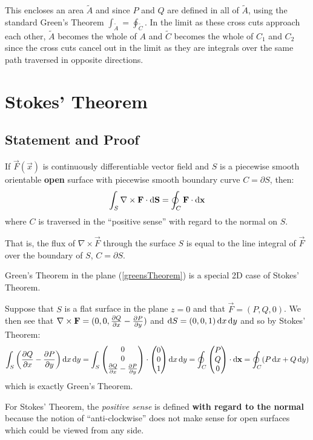 \documentclass[../main.tex]{subfiles}
\begin{document}
This encloses an area $\widetilde{A}$ and since $P$ and $Q$ are defined in all of $\widetilde{A}$, using the standard Green's Theorem $\int_{\widetilde{A}} = \oint_{\widetilde{C}}$.
In the limit as these cross cuts approach each other, $\widetilde{A}$ becomes the whole of $A$ and $\widetilde{C}$ becomes the whole of $C_1$ and $C_2$ since the cross cuts cancel out in the limit as they are integrals over the same path traversed in opposite directions.
\section{Stokes' Theorem}
\subsection{Statement and Proof}
\begin{theorem}
  If $\vec{F}(\vec{x})$ is continuously differentiable vector field and $S$ is a piecewise smooth orientable \textbf{open} surface with piecewise smooth boundary curve $C= \partial S$, then:
  \label{stokesTheorem}
  \[
    \int_{S} \nabla \times \vec{F} \cdot \d{\vec{S}} = \oint_{C} \vec{F} \cdot \d{\vec{x}}
  \]
  where $C$ is traversed in the ``positive sense'' with regard to the normal on $S$.

  That is, the flux of $\nabla \times \vec{F}$ through the surface $S$ is equal to the line integral of $\vec{F}$ over the boundary of $S$, $C = \partial S$.
\end{theorem}
\begin{remark}
  Green's Theorem in the plane (\cref{greensTheorem}) is a special 2D case of Stokes' Theorem.

  Suppose that $S$ is a flat surface in the plane $z = 0$ and that $\vec{F} = (P, Q, 0)$.
  We then see that $\nabla \times \vec{F} = (0, 0, \pderiv{Q}{x} - \pderiv{P}{y})$ and $\d{S} = (0, 0, 1)\d{x}\d{y}$ and so by Stokes' Theorem:
  \[
    \int_{S} \left(\pderiv{Q}{x} - \pderiv{P}{y}\right) \d{x}\d{y} = \int_{S} \begin{pmatrix}
    0 \\
    0 \\
    \pderiv{Q}{x} - \pderiv{P}{y} \\
    \end{pmatrix} \cdot \begin{pmatrix}
    0 \\
    0 \\
    1 \\
    \end{pmatrix} \d{x} \d{y} =
    \oint_{C} \begin{pmatrix}
    P \\
    Q \\
    0 \\
    \end{pmatrix} \cdot \d{\vec{x}} =
    \oint_{C} (P \d{x} + Q \d{y})
  \]
  which is exactly Green's Theorem.
\end{remark}
For Stokes' Theorem, the \textit{positive sense} is defined \textbf{with regard to the normal} because the notion of ``anti-clockwise'' does not make sense for open surfaces which could be viewed from any side.
\end{document}
